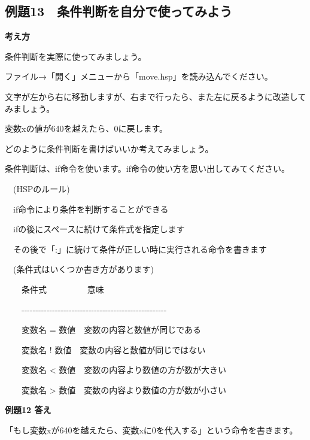 \documentclass[a4paper,12pt]{jarticle}
\begin{document}
\clearpage
\subsection{例題13　条件判断を自分で使ってみよう}
\bigskip
\bigskip

{\bfseries
考え方}

\bigskip

条件判断を実際に使ってみましょう。

ファイル→「開く」メニューから「move.hsp」を読み込んでください。

文字が左から右に移動しますが、右まで行ったら、また左に戻るように改造してみましょう。

変数xの値が640を越えたら、0に戻します。

どのように条件判断を書けばいいか考えてみましょう。

\bigskip

条件判断は、if命令を使います。if命令の使い方を思い出してみてください。

\bigskip

\ \ (HSPのルール)

\bigskip

\ \ if命令により条件を判断することができる

\ \ ifの後にスペースに続けて条件式を指定します

\ \ その後で「:」に続けて条件が正しい時に実行される命令を書きます

\bigskip

\ \ (条件式はいくつか書き方があります)

\bigskip

\ \ \ \ 条件式 \ \ \ \ \ \ \ \ \ 意味

\ \ \ \ {}-{}-{}-{}-{}-{}-{}-{}-{}-{}-{}-{}-{}-{}-{}-{}-{}-{}-{}-{}-{}-{}-{}-{}-{}-{}-{}-{}-{}-{}-{}-{}-{}-{}-{}-{}-{}-{}-{}-{}-{}-{}-{}-{}-{}-{}-{}-{}-{}-{}-{}-{}-

\ \ \ \ 変数名 =
数値\ \ 変数の内容と数値が同じである

\ \ \ \ 変数名 !
数値\ \ 変数の内容と数値が同じではない

\ \ \ \ 変数名 {\textless}
数値\ \ 変数の内容より数値の方が数が大きい

\ \ \ \ 変数名 {\textgreater}
数値\ \ 変数の内容より数値の方が数が小さい

\bigskip
\bigskip

{\bfseries
例題12 答え}

\bigskip

「もし変数xが640を越えたら、変数xに0を代入する」という命令を書きます。
\end{document}
